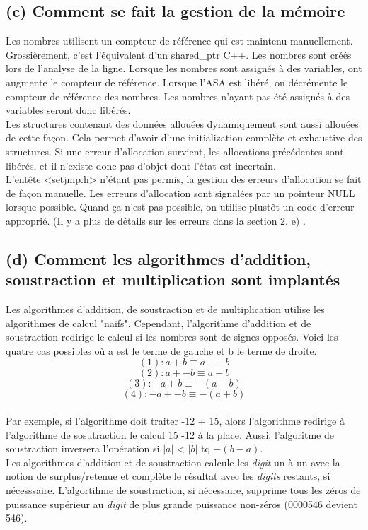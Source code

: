 \documentclass[a4paper,12pt]{article}
\begin{document}
	\subsection{(c) Comment se fait la gestion de la mémoire}
		Les nombres utilisent un compteur de référence qui est maintenu manuellement. Grossièrement,
		c'est l'équivalent d'un shared\_ptr C++. Les nombres sont créés lors de l'analyse de la
		ligne. Lorsque les nombres sont assignés à des variables, ont augmente le compteur de
		référence. Lorsque l'ASA est libéré, on décrémente le compteur de référence des nombres.
		Les nombres n'ayant pas été assignés à des variables seront donc libérés.\\

		Les structures contenant des données allouées dynamiquement sont aussi allouées de cette
		façon. Cela permet d'avoir d'une initialization complète et exhaustive des structures.
		Si une erreur d'allocation survient, les allocations précédentes sont libérés, et il
		n'existe donc pas d'objet dont l'état est incertain.\\

		L'entête <setjmp.h> n'étant pas permis, la gestion des erreurs d'allocation se fait de
		façon manuelle. Les erreurs d'allocation sont signalées par un pointeur NULL lorsque
		possible. Quand ça n'est pas possible, on utilise plustôt un code d'erreur approprié.
		(Il y a plus de détails sur les erreurs dans la section 2. e) .\\
	\subsection{(d) Comment les algorithmes d’addition, soustraction et multiplication sont implantés}
		Les algorithmes d'addition, de soustraction et de multiplication utilise les algorithmes de calcul "naïfs".
		Cependant, l'algorithme d'addition et de soustraction redirige le calcul si les nombres sont de signes opposés. Voici les quatre cas possibles où a est le terme de gauche et b le terme de droite.
		\[ (1) : a + b \equiv a - -b\]
		\[ (2) : a + -b \equiv a - b  \]
		\[ (3) : -a + b \equiv -(a-b) \]
		\[ (4) : -a + -b \equiv -(a+b) \]
		\\Par exemple, si l'algorithme doit traiter -12 + 15, alors l'algorithme redirige à l'algorithme de sosutraction le calcul 15 -12 à la place. Aussi, l'algoritme de soustraction inversera l'opération si $|a|$ < $|b|$ tq $-(b-a)$.\\

		Les algorithmes d'addition et de soustraction calcule les \textit{digit} un à un avec la notion de surplus/retenue et complète le résultat avec les \textit{digits} restants, si nécesssaire. L'algortihme de soustraction, si nécessaire, supprime tous les zéros de puissance supérieur au \textit{digit} de plus grande puissance non-zéros (0000546 devient 546).\\
\end{document}
